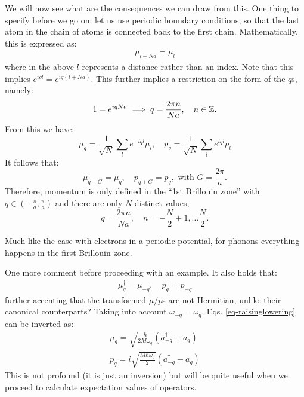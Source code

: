 We will now see what are the consequences we can draw from this. One thing to specify before we go on: let us use periodic boundary conditions, so that the last atom in the chain of atoms is connected back to the first chain. Mathematically, this is expressed as:
\begin{align*}
    \mu_{l + Na} = \mu_l
\end{align*}
where in the above $l$ represents a distance rather than an index. Note that this implies $e^{iql} = e^{iq(l+Na)}$. This further implies a restriction on the form of the $q$s, namely:
\begin{equation}
    1 = e^{iqNa} \implies q = \frac{2\pi n}{Na}, \quad n \in \mathbb{Z}.
\end{equation}
From this we have:
\begin{equation}
    \mu_q = \frac{1}{\sqrt{N}}\sum_l e^{-iql}\mu_l, \quad p_q = \frac{1}{\sqrt{N}}\sum_l e^{iql}p_l
\end{equation}
It follows that:
\begin{equation}
    \mu_{q + G} = \mu_q, \quad p_{q + G} = p_q, \text{ with } G = \frac{2\pi}{a}.
\end{equation}
Therefore; momentum is only defined in the ``1st Brillouin zone'' with $q \in (-\frac{\pi}{a}, \frac{\pi}{a})$ and there are only $N$ distinct values,
\begin{equation}
    q = \frac{2\pi n}{Na}, \quad  n = -\frac{N}{2} + 1, \ldots \frac{N}{2}.
\end{equation}

Much like the case with electrons in a periodic potential, for phonons everything happens in the first Brillouin zone. 

One more comment before proceeding with an example. It also holds that:
\begin{align*}
    \mu_q^\dag = \mu_{-q}, \quad p_q^\dag = p_{-q}
\end{align*}
further accenting that the transformed $\mu/p$s are not Hermitian, unlike their canonical counterparts? Taking into account $\omega_{-q} = \omega_q$, Eqs. \eqref{eq-raisinglowering} can be inverted as:
\begin{equation}
    \begin{split}
        \mu_q = \sqrt{\frac{\hbar}{2M\omega_q}}(a^\dag_{-q} + a_q)
        \\ p_q = i\sqrt{\frac{M\hbar \omega_q}{2}}(a^\dag_{-q} - a_q)
    \end{split}
\end{equation}
This is not profound (it is just an inversion) but will be quite useful when we proceed to calculate expectation values of operators.

